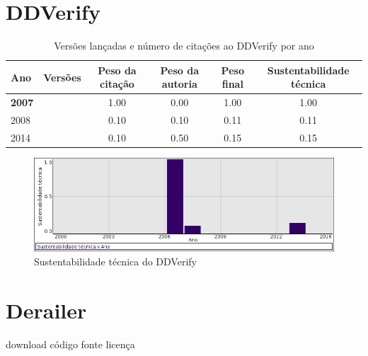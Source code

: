 \section{DDVerify}


\begin{table}[H]
\caption{Versões lançadas e número de citações ao DDVerify por ano}
\centering
\begin{tabular}{| l | c | c | c | c | c |}
  \hline
  Ano & Versões & Peso da citação & Peso da autoria & Peso final & Sustentabilidade técnica \\
  \hline
            {\bf 2007}
          &
          
          &
          1.00
          &
          0.00
          &
          1.00
          &
            {\color{blue} 1.00}
          \\
\hline
            2008
          &
          
          &
          0.10
          &
          0.10
          &
          0.11
          &
            {\color{red} 0.11}
          \\
\hline
            2014
          &
          
          &
          0.10
          &
          0.50
          &
          0.15
          &
            {\color{red} 0.15}
          \\
\hline
\end{tabular}
\end{table}

\begin{figure}[h]
  \center
  \includegraphics[scale=0.50]{imagens/softwares-charts/ddverify.png}
  \caption{Sustentabilidade técnica do DDVerify}
\end{figure}


\section{Derailer}
\checkmark download
\checkmark código fonte
\checkmark licença


